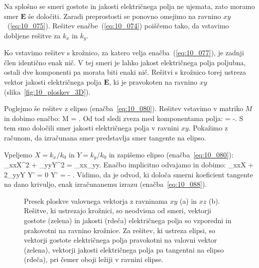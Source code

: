 Na splošno se smeri gostote in jakosti električnega polja ne ujemata, zato moramo smer $\mathbf{E}$
še določiti. Zaradi preprostosti se ponovno omejimo na ravnino $xy$~(\ref{eq:10_075}). Rešitev 
enačbe~(\ref{eq:10_074}) poiščemo tako, da vstavimo dobljene rešitve za $k_x$ in $k_y$.

Ko vstavimo rešitev s krožnico, za katero velja enačba~(\ref{eq:10_077}), je zadnji člen identično 
enak nič. V tej smeri je lahko jakost električnega polja poljubna, ostali dve komponenti pa morata
biti enaki nič. Rešitvi s krožnico torej ustreza vektor jakosti električnega polja $\mathbf{E}$, ki
je pravokoten na ravnino $xy$ (slika~\ref{fig:10_ploskev_3D}).

Poglejmo še rešitev z elipso (enačba~\ref{eq:10_080}). Rešitev vstavimo v matriko $M$ in dobimo
enačbo:
\beq
M \cdot {}=  \cdot
{}.
\label{eq:10_087}
\eeq
Od tod sledi zveza med komponentama polja:
\beq
{} = -.
\label{eq:10_088}
\eeq
S tem smo določili smer jakosti električnega polja v ravnini $xy$. Pokažimo z računom,
da izračunana smer predstavlja smer tangente na elipso. 

Vpeljemo $X = k_x/k_0$ in $Y = k_y/k_0$
in zapišemo elipso (enačba~\ref{eq:10_080}):
\beq
\varepsilon_{xx}X^2 + \varepsilon_{yy}Y^2 = \varepsilon_{xx}\varepsilon_{yy}.
\label{eq:10_089}
\eeq
Enačbo implicitno odvajamo in dobimo:
\varepsilon_{xx}X + 2\varepsilon_{yy}Y Y' = 0 \qquad \Longrightarrow \qquad 
Y' = -  .
\label{eq:10_090}
\eeq
Vidimo, da je odvod, ki določa smerni koeficient tangente na dano krivuljo, enak
izračunanemu izrazu (enačba~\ref{eq:10_088}).
\begin{figure}[h]
\centering
\def\svgwidth{130truemm} 

\caption{Presek ploskve valovnega vektorja z ravninama $xy$ (a) in $xz$ (b). 
Rešitve, ki ustrezajo krožnici, so neodvisna od smeri, vektorji gostote (zelena) in jakosti 
(rdeča) električnega polja so vzporedni in prakovotni na ravnino krožnice. Za rešitev, ki ustreza 
elipsi, so vektorji gostote električnega polja pravokotni na valovni vektor (zelena), vektorji
jakosti električnega polja pa tangentni na elipso (rdeča), pri čemer oboji ležiji v ravnini elipse.}
\label{fig:10_ploskev_tangenta}
\end{figure}

